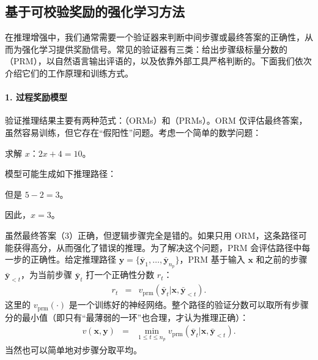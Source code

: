 \subsection{基于可校验奖励的强化学习方法}
\label{sec:reasoning-verification}

在推理增强中，我们通常需要一个验证器来判断中间步骤或最终答案的正确性，从而为强化学习提供奖励信号。常见的验证器有三类：给出步骤级标量分数的（PRM），以自然语言输出评语的，以及依靠外部工具严格判断的。下面我们依次介绍它们的工作原理和训练方式。

\paragraph{1. 过程奖励模型}

验证推理结果主要有两种范式：（ORMs）和（PRMs）\cite{uesato-etal:2022solving,lightman-etal:2024lets}。ORM 仅评估最终答案，虽然容易训练，但它存在“假阳性”问题。考虑一个简单的数学问题：

\vspace{0.5em}

\begin{tcolorbox}[
    frame empty,
    colback=black!5,
    coltext=black
]

求解 $x$：$2x + 4 = 10$。

\end{tcolorbox}

\vspace{0.5em}

模型可能生成如下推理路径：
\vspace{0.5em}

\begin{tcolorbox}[
    frame empty,
    colback=black!5,
    coltext=black
]

但是 $5 - 2 = 3$。

因此，$x = 3$。

\end{tcolorbox}

\vspace{0.5em}

虽然最终答案（$3$）正确，但逻辑步骤完全是错的。如果只用 ORM，这条路径可能获得高分，从而强化了错误的推理。为了解决这个问题，PRM 会评估路径中每一步的正确性。给定推理路径 $\mathbf{y} = \{\bar{\mathbf{y}}_1, \dots, \bar{\mathbf{y}}_{n_p}\}$，PRM 基于输入 $\mathbf{x}$ 和之前的步骤 $\bar{\mathbf{y}}_{<t}$，为当前步骤 $\bar{\mathbf{y}}_t$ 打一个正确性分数 $r_t$：
\begin{eqnarray}
r_t & = & v_{\mathrm{prm}}(\bar{\mathbf{y}}_t | \mathbf{x}, \bar{\mathbf{y}}_{<t}).
\end{eqnarray}
这里的 $v_{\mathrm{prm}}(\cdot)$ 是一个训练好的神经网络。整个路径的验证分数可以取所有步骤分的最小值（即只有“最薄弱的一环”也合理，才认为推理正确）：
\begin{eqnarray}
v(\mathbf{x}, \mathbf{y}) & = & \min_{1 \le t \le n_p} v_{\mathrm{prm}}(\bar{\mathbf{y}}_t | \mathbf{x}, \bar{\mathbf{y}}_{<t}).
\end{eqnarray}
当然也可以简单地对步骤分取平均。

